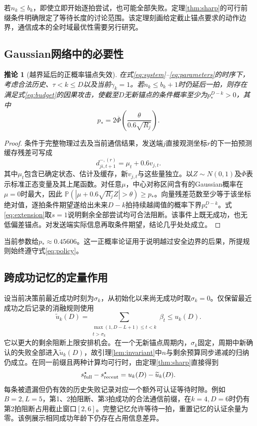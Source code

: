 \documentclass[UTF8,a4paper,zihao=5,fontset=windows]{ctexart}
\newtheorem{corollary}{推论}
\newcommand{\Prb}{\mathbb P}
\begin{document}
若$n_k\le b_k$，即使立即开始逐拍尝试，也可能全部失败。定理\ref{thm:sharp}的可行前缀条件明确限定了等待长度的讨论范围。该定理刻画给定截止锚点要求的动作边界，通信成本的全时域最优性需要另行研究。

\subsection{Gaussian网络中的必要性}
\begin{corollary}[越界延后的正概率锚点失效]\label{cor:gaussian}
在式\eqref{eq:system}--\eqref{eq:parameters}的时序下，考虑合法历史、$\tau<k\le D$以及当前$\gamma_k=1$。若$n_k\le b_k+1$时仍延后一拍，则存在满足式\eqref{eq:budget}的因果攻击，使截至$D$无新锚点的条件概率至少为$p_*^{D-k}>0$，其中
\begin{equation}
p_*=2\overline\Phi\!\left(\frac{\theta}{0.6\sqrt{R_j}}\right).
\label{eq:gaussian}
\end{equation}
\end{corollary}
\begin{proof}
条件于完整物理过去及当前通信结果，发送端$j$直接观测坐标$r$的下一拍预测缓存残差可写成
\[
d_{ji,t+1}^{-,(r)}=\mu_t+0.6v_{j,t}.
\]
其中$\mu_t$包含已确定状态、估计及缓存，新$v_{j,t}$与这些量独立。以$Z\sim N(0,1)$及$\overline\Phi$表示标准正态变量及其上尾函数。对任意$\mu$，中心对称区间含有的Gaussian概率在$\mu=0$时最大，因此
$\Prb(|\mu+0.6\sqrt{R_j}Z|>\theta)\ge p_*$。向量残差范数至少等于该坐标绝对值，逐拍条件期望遂给出未来$D-k$拍持续越阈值的概率下界$p_*^{D-k}$。式\eqref{eq:extension}取$s=1$说明剩余全部尝试均可合法阻断。该事件上既无成功，也无低偏差锚点。对发送端实际信息再取条件期望，结论几乎处处成立。
\end{proof}

当前参数给$p_*\approx0.45606$。这一正概率论证用于说明越过安全边界的后果，所提规则始终遵守式\eqref{eq:policy}。

\subsection{跨成功记忆的定量作用}
设当前决策前最近成功时刻为$\sigma_k$，从初始化以来尚无成功时取$\sigma_k=0$。仅保留最近成功之后记录的消融规则使用
\begin{equation}
\widetilde u_k(D)=
\sum_{\substack{\max(1,D-L+1)\le t<k\\t>\sigma_k}}\beta_t
\le u_k(D).
\label{eq:recent}
\end{equation}
它以更大的剩余阻断上限安排机会。在一个无新锚点周期内，$\sigma_k$固定，周期中新确认的失败全部进入$\widetilde u_k(D)$，故引理\ref{lem:invariant}中$n$与剩余预算同步递减的归纳仍成立。在同一前缀且两种计算均可行时，由定理\ref{thm:sharp}直接得到
\begin{equation}
s^\star_{\rm full}-s^\star_{\rm recent}=u_k(D)-\widetilde u_k(D).
\label{eq:memory}
\end{equation}
每条被遗漏但仍有效的历史失败记录对应一个额外可认证等待时隙。例如$B=2,L=5$，第1、2拍阻断、第3拍成功的合法通信前缀，在$k=4,D=6$时仍有第2拍阻断占用截止窗口$[2,6]$。完整记忆允许等待一拍，重置记忆的认证余量为零。该例展示相同成功年龄下仍存在占用信息差异。
\end{document}
